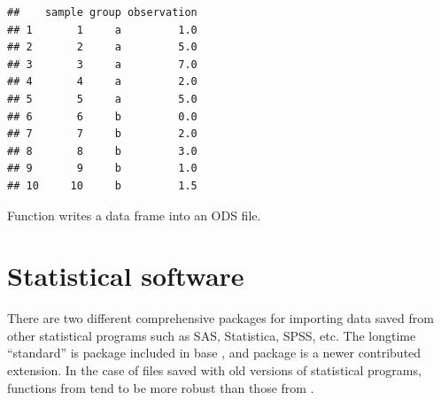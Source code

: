 \documentclass[krantz2]{krantz}\usepackage{knitr}
\begin{document}
\begin{knitrout}\footnotesize
{}\color{fgcolor}\begin{kframe}
\begin{alltt}
 \hlkwb{<-} \hlstd{(}\hlstd{,}  \hlstd{=} \hlstd{)}
\end{alltt}


{\ttfamily\noindent\itshape\color{messagecolor}{\#\# Parsed with column specification:\\\#\# cols(\\\#\#\ \  sample = col\_double(),\\\#\#\ \  group = col\_character(),\\\#\#\ \  observation = col\_double()\\\#\# )}}\end{kframe}
\end{knitrout}

\begin{knitrout}\footnotesize
{}\color{fgcolor}\begin{kframe}
\begin{alltt}
\end{alltt}
\begin{verbatim}
##    sample group observation
## 1       1     a         1.0
## 2       2     a         5.0
## 3       3     a         7.0
## 4       4     a         2.0
## 5       5     a         5.0
## 6       6     b         0.0
## 7       7     b         2.0
## 8       8     b         3.0
## 9       9     b         1.0
## 10     10     b         1.5
\end{verbatim}
\end{kframe}
\end{knitrout}

Function  writes a data frame into an ODS file.

\section{Statistical software}\label{sec:files:stat}

There are two different comprehensive packages for importing data saved from other statistical programs such as SAS, Statistica, SPSS, etc. The longtime ``standard'' is package  included in base \Rlang, and package  is a newer contributed extension. In the case of files saved with old versions of statistical programs, functions from  tend to be more robust than those from .
\end{document}
